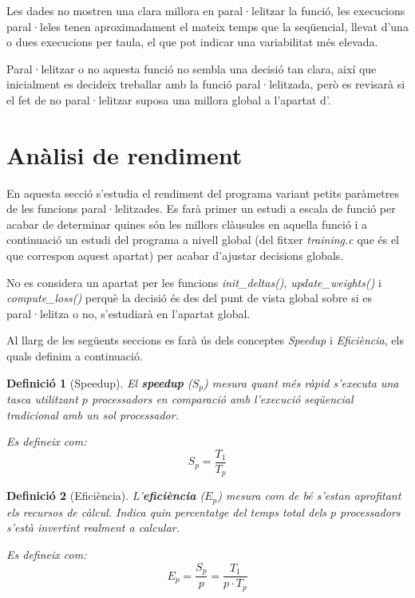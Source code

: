 \documentclass{article}
\newtheorem{defibox}{Definició}[section] %
\begin{document}
Les dades no mostren una clara millora en paral·lelitzar la funció, les execucions paral·leles tenen aproximadament el mateix temps que la seqüencial, llevat d'una o dues execucions per taula, el que pot indicar una variabilitat més elevada.

Paral·lelitzar o no aquesta funció no sembla una decisió tan clara, així que inicialment es decideix treballar amb la funció paral·lelitzada, però es revisarà si el fet de no paral·lelitzar suposa una millora global a l'apartat d'\texttt{}.

\newpage
\section{Anàlisi de rendiment}
\label{sec:performance_analysis}

En aquesta secció s'estudia el rendiment del programa variant petits paràmetres de les funcions paral·lelitzades. Es farà primer un estudi a escala de funció per acabar de determinar quines són les millors clàusules en aquella funció i a continuació un estudi del programa a nivell global (del fitxer \textit{training.c} que és el que correspon aquest apartat) per acabar d'ajustar decisions globals.

No es considera un apartat per les funcions \textit{init\_deltas()}, \textit{update\_weights()} i \textit{compute\_loss()} perquè la decisió és des del punt de vista global sobre si es paral·lelitza o no, s'estudiarà en l'apartat global.

Al llarg de les següents seccions es farà ús dels conceptes \textit{Speedup} i \textit{Eficiència}, els quals definim a continuació.

\begin{defibox}[Speedup]
El \textbf{speedup} ($S_p$) mesura quant més ràpid s'executa una tasca utilitzant $p$ processadors en comparació amb l'execució seqüencial tradicional amb un sol processador.

Es defineix com:
\[
S_p = \frac{T_1}{T_p}
\]
\end{defibox}

\begin{defibox}[Eficiència]
L'\textbf{eficiència} ($E_p$) mesura com de bé s'estan aprofitant els recursos de càlcul. Indica quin percentatge del temps total dels $p$ processadors s'està invertint realment a calcular.

Es defineix com:
\[
E_p = \frac{S_p}{p} = \frac{T_1}{p\cdot T_p}
\]
\end{defibox}
\end{document}
